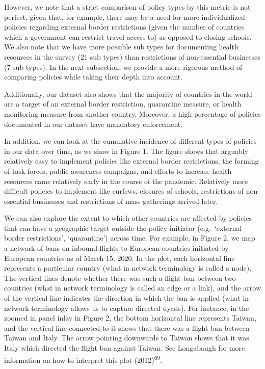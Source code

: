\documentclass[]{article}
\begin{document}
However, we note that a strict comparison of policy types by this metric is not perfect, given that, for example, there may be a need for more individualized policies regarding external border restrictions (given the number of countries which a government can restrict travel access to) as opposed to closing schools. We also note that we have more possible sub types for documenting health resources in the survey (21 sub types) than restrictions of non-essential businesses (7 sub types). In the next subsection, we provide a more rigorous method of comparing policies while taking their depth into account.

Additionally, our dataset also shows that the majority of countries in the world are a target of an external border restriction, quarantine measure, or health monitoring measure from another country. Moreover, a high percentage of policies documented in our dataset have mandatory enforcement.

In addition, we can look at the cumulative incidence of different types of policies in our data over time, as we show in Figure 1. The figure shows that arguably relatively easy to implement policies like external border restrictions, the forming of task forces, public awareness campaigns, and efforts to increase health resources came relatively early in the course of the pandemic. Relatively more difficult policies to implement like curfews, closures of schools, restrictions of non-essential businesses and restrictions of mass gatherings arrived later.

We can also explore the extent to which other countries are affected by policies that can have a geographic target outside the policy initiator (e.g.~`external border restrictions', `quarantine') across time. For example, in Figure 2, we map a network of bans on inbound flights to European countries initiated by European countries as of March 15, 2020. In the plot, each horizontal line represents a particular country (what in network terminology is called a node). The vertical lines denote whether there was such a flight ban between two countries (what in network terminology is called an edge or a link), and the arrow of the vertical line indicates the direction in which the ban is applied (what in network terminology allows us to capture directed dyads). For instance, in the zoomed in panel inlay in Figure 2, the bottom horizontal line represents Taiwan, and the vertical line connected to it shows that there was a flight ban between Taiwan and Italy. The arrow pointing downwards to Taiwan shows that it was Italy which directed the flight ban against Taiwan. See Longabaugh for more information on how to interpret this plot (2012)\textsuperscript{69}.
\end{document}
